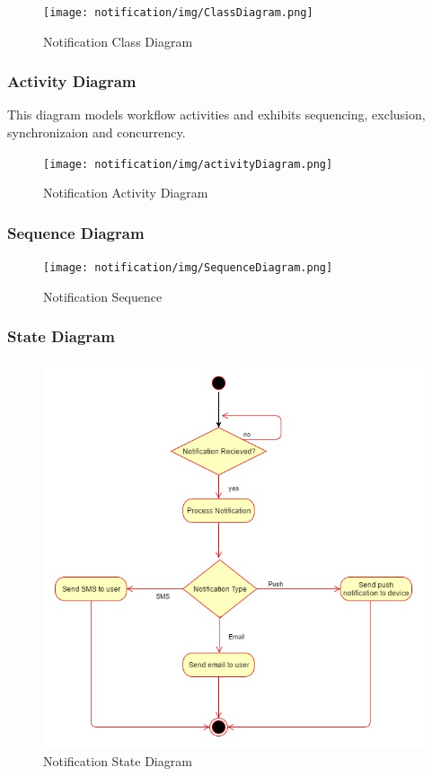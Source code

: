 \begin{figure}[H]
	\centering
	\texttt{[image: notification/img/ClassDiagram.png]}
	\caption{Notification Class Diagram}
\end{figure}


\subsubsection{Activity Diagram}
This diagram models workflow activities and exhibits sequencing, exclusion, synchronizaion and concurrency.
\begin{figure}[H]
	\centering
	\texttt{[image: notification/img/activityDiagram.png]}
	\caption{Notification Activity Diagram}
\end{figure}


\subsubsection{Sequence Diagram}

\begin{figure}[H]
	\centering
	\texttt{[image: notification/img/SequenceDiagram.png]}
	\caption{Notification Sequence}
\end{figure}



\subsubsection{State Diagram}

\begin{figure}[H]
	\centering
	\includegraphics[width=\textwidth]{notification/img/NotificationState.jpg}
	\caption{Notification State Diagram}
\end{figure}




